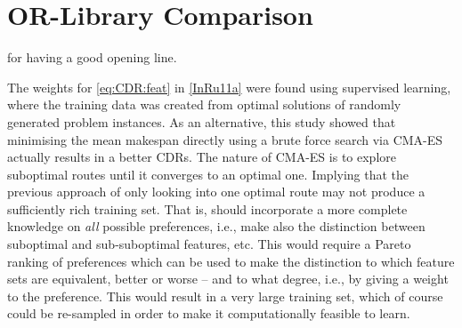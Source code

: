

\chapter{OR-Library Comparison}\label{ch:experiments} 

 for having a good opening line. 




The weights for \cref{eq:CDR:feat} in \cref{InRu11a} were found using 
supervised learning, where the training data was created from optimal solutions 
of randomly generated problem instances. As an alternative, this study showed  
that minimising the mean makespan directly using a brute force search via 
CMA-ES actually results in a better CDRs. The nature of CMA-ES is to explore 
suboptimal routes until it converges to an optimal one. Implying that the 
previous approach of only looking into one optimal route may not produce a 
sufficiently rich training set. That is, \PhiSet{\pi} should incorporate a 
more complete knowledge on \emph{all} possible preferences, i.e., make also the 
distinction between suboptimal and sub-suboptimal features, etc.  This would 
require a Pareto ranking of preferences which can be used to make the 
distinction to which feature sets are equivalent, better or worse -- and to 
what degree, i.e., by giving a weight to the preference. This would result in a 
very large training set, which of course could be re-sampled in order to make 
it computationally feasible to learn.
